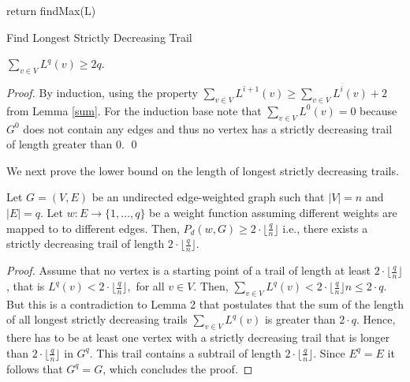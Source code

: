 \begin{isabellebody}
\begin{isamarkuptext}
\begin{algorithm}[H]
	\SetAlgoLined
	

	return findMax(L)\;

\caption{Find Longest Strictly Decreasing Trail}\label{algo}
\end{algorithm}

\begin{lemma}$\sum_{v\in V} L^{q}(v) \ge 2q$. \end{lemma}

\begin{proof}
By induction, using the property $\sum_{v\in V} L^{i+1}(v) \ge \sum_{v\in V} L^{i}(v)+2$ from Lemma \ref{sum}. For the induction base note that $\sum_{v\in V} L^{0}(v) = 0$ 
because $G^0$ does not contain any edges and thus no vertex has a strictly decreasing trail of length greater than 0. \qed \end{proof}

\noindent We next prove the lower bound on the length of longest strictly decreasing trails.

\begin{theorem}Let $G = (V,E)$ be an undirected edge-weighted graph such that $|V|=n$ and $|E| = q$. Let  
$w:E\rightarrow \{1,\ldots,q\}$ be a weight function assuming different weights are mapped to to different edges. 
Then, $P_d(w,G) \ge 2\cdot\lfloor\frac{q}{n}\rfloor$ i.e., there 
exists a strictly decreasing trail of length $2\cdot\lfloor\frac{q}{n}\rfloor$.\label{main}\end{theorem}

\begin{proof}Assume that no vertex is a starting point of a trail of length at least $2\cdot\lfloor\frac{q}{n}\rfloor$, that is
	$L^{q}(v) < 2\cdot\lfloor\frac{q}{n}\rfloor,$ for all $v \in V$. 
	Then, $\sum_{v\in V} L^{q}(v) < 2\cdot\lfloor\frac{q}{n}\rfloor n \le 2\cdot q$. But this is a contradiction 
	to Lemma 2 that postulates that the sum of the length of all longest strictly decreasing trails $\sum_{v\in V} L^{q}(v)$ is greater than $2\cdot q$.
	Hence, there has to be at least one vertex with a strictly decreasing trail that is longer than $2\cdot\lfloor\frac{q}{n}\rfloor$ in $G^q$.
	This trail contains a subtrail of length $2\cdot\lfloor\frac{q}{n}\rfloor$. Since $E^q=E$ it follows that $G^q=G$, which concludes 
	the proof. 
\end{proof} 


\end{isamarkuptext}
\end{isabellebody}
